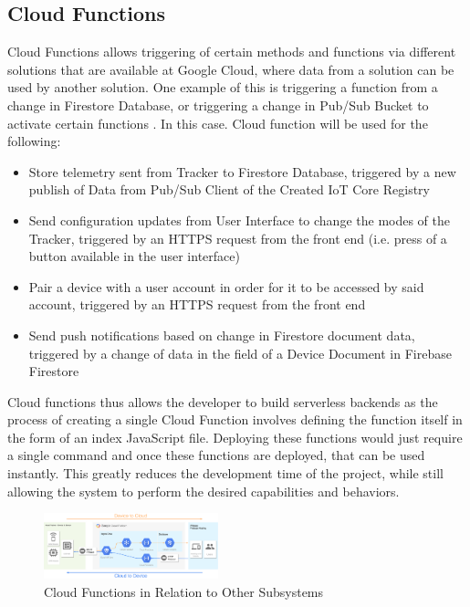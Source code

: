 \documentclass[conference]{IEEEtran}
\begin{document}
\subsection{Cloud Functions}
Cloud Functions allows triggering of certain methods and functions via different solutions that are available at Google Cloud, where data from a solution can be used by another solution. One example of this is triggering a function from a change in Firestore 
Database, or triggering a change in Pub/Sub Bucket to activate certain functions \cite{cloudfunctionwebsite}. In this case. Cloud function will be used for the following:
\begin{itemize}
\item Store telemetry sent from Tracker to Firestore Database, triggered by a new publish of Data from Pub/Sub Client of the Created IoT Core Registry
\item Send configuration updates from User Interface to change the modes of the Tracker, triggered by an HTTPS request from the front end (i.e. press of a button available in the user interface)
\item Pair a device with a user account in order for it to be accessed by said account, triggered by an HTTPS request from the front end
\item Send push notifications based on change in Firestore document data, triggered by a change of data in the field of a Device Document in Firebase Firestore
\end{itemize}
Cloud functions thus allows the developer to build serverless backends as the process of creating a single Cloud Function involves defining the function itself in the form of an index JavaScript file. Deploying these functions would just require a single command 
and once these functions are deployed, that can be used instantly. This greatly reduces the development time of the project, while still allowing the system to perform the desired capabilities and behaviors.  
\begin{figure}[htbp]
    \centering
    \includegraphics[width=0.45\textwidth]{skematikdiagram2}
    \caption{Cloud Functions in Relation to Other Subsystems}
    \label{fig1}
\end{figure}
\end{document}
